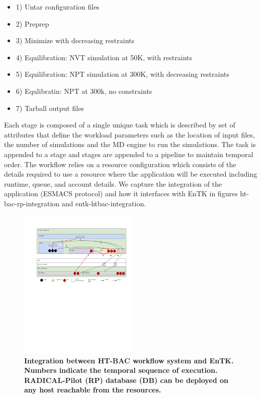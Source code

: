 \begin{itemize}
	\item 1) Untar configuration files
	\item 2) Preprep
	\item 3) Minimize with decreasing restraints
	\item 4) Equilibration: NVT simulation at 50K, with restraints
	\item 5) Equilibration: NPT simulation at 300K, with decreasing restraints 
	\item 6) Equlibratin: NPT at 300k, no constraints
	\item 7) Tarball output files 
\end{itemize}

Each stage is composed of a single unique task which is described by set of attributes that define the workload parameters such as the location of input files, the number of simulations and the MD engine to run the simulations. The task is appended to a stage and stages are appended to a pipeline to maintain temporal order. The workflow relies on a resource configuration which consists of the details required to use a resource where the application will be executed including runtime, queue, and account details. We capture the integration of the application (ESMACS protocol) and how it interfaces with EnTK in figures ht-bac-rp-integration and entk-htbac-integration. 

\begin{figure}[tb]
\centering
  \includegraphics[width=0.5\textwidth]{FIGURES/ht-bac-rp_integration.pdf}
  \caption{\bf Integration between HT-BAC workflow system and EnTK. Numbers indicate the temporal sequence of execution. RADICAL-Pilot (RP) database (DB) can be deployed on any host reachable from the resources.}
   \label{figure:ht-bac_rp}
\end{figure}


